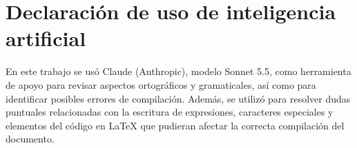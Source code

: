 \section*{Declaración de uso de inteligencia artificial}

En este trabajo se usó Claude (Anthropic), modelo Sonnet 5.5, como herramienta de apoyo para revisar aspectos ortográficos y gramaticales, así como para identificar posibles errores de compilación. Además, se utilizó para resolver dudas puntuales relacionadas con la escritura de expresiones, caracteres especiales y elementos del código en LaTeX que pudieran afectar la correcta compilación del documento.
